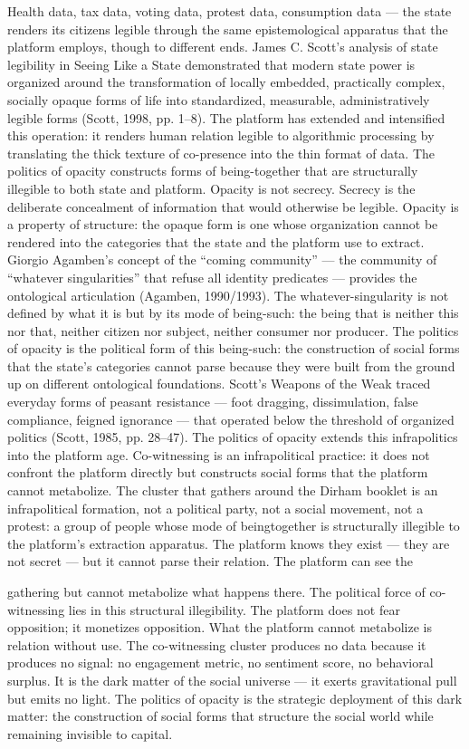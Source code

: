 Health data, tax data, voting data, protest data, consumption data — the state renders its citizens legible through the same epistemological apparatus that the platform employs, though to different ends. James C. Scott’s analysis of state legibility in Seeing Like a State demonstrated that modern state power is organized around the transformation of locally embedded, practically complex, socially opaque forms of life into standardized, measurable, administratively legible forms (Scott, 1998, pp. 1–8). The platform has extended and intensified this operation: it renders human relation legible to algorithmic processing by translating the thick texture of co-presence into the thin format of data. The politics of opacity constructs forms of being-together that are structurally illegible to both state and platform. Opacity is not secrecy. Secrecy is the deliberate concealment of information that would otherwise be legible. Opacity is a property of structure: the opaque form is one whose organization cannot be rendered into the categories that the state and the platform use to extract. Giorgio Agamben’s concept of the “coming community” — the community of “whatever singularities” that refuse all identity predicates — provides the ontological articulation (Agamben, 1990/1993). The whatever-singularity is not defined by what it is but by its mode of being-such: the being that is neither this nor that, neither citizen nor subject, neither consumer nor producer. The politics of opacity is the political form of this being-such: the construction of social forms that the state’s categories cannot parse because they were built from the ground up on different ontological foundations. Scott’s Weapons of the Weak traced everyday forms of peasant resistance — foot dragging, dissimulation, false compliance, feigned ignorance — that operated below the threshold of organized politics (Scott, 1985, pp. 28–47). The politics of opacity extends this infrapolitics into the platform age. Co-witnessing is an infrapolitical practice: it does not confront the platform directly but constructs social forms that the platform cannot metabolize. The cluster that gathers around the Dirham booklet is an infrapolitical formation, not a political party, not a social movement, not a protest: a group of people whose mode of beingtogether is structurally illegible to the platform’s extraction apparatus. The platform knows they exist — they are not secret — but it cannot parse their relation. The platform can see the

gathering but cannot metabolize what happens there. The political force of co-witnessing lies in this structural illegibility. The platform does not fear opposition; it monetizes opposition. What the platform cannot metabolize is relation without use. The co-witnessing cluster produces no data because it produces no signal: no engagement metric, no sentiment score, no behavioral surplus. It is the dark matter of the social universe — it exerts gravitational pull but emits no light. The politics of opacity is the strategic deployment of this dark matter: the construction of social forms that structure the social world while remaining invisible to capital.

